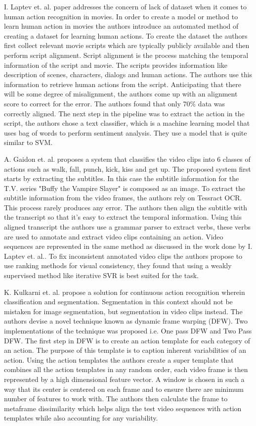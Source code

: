\documentclass[12pt]{report}
\begin{document}
	\cite{i-laptev} I. Laptev et. al. paper addresses the concern of lack of dataset when it comes to human action recognition in movies. In order to create a model or method to learn human action in movies the authors introduce an automated method of creating a dataset for learning human actions. To create the dataset the authors first collect relevant movie scripts which are typically publicly available and then perform script alignment. Script alignment is the process matching the temporal information of the script and movie. The scripts provides information like description of scenes, characters, dialogs and human actions. The authors use this information to retrieve human actions from the script. Anticipating that there will be some degree of misalignment, the authors come up with an alignment score to correct for the error. The authors found that only 70\% data was correctly aligned. The next step in the pipeline was to extract the action in the script, the authors chose a text classifier, which is a machine learning model that uses bag of words to perform sentiment analysis. They use a model that is quite similar to SVM.
	
	\cite{gaidon}A. Gaidon et. al. proposes a system that classifies the video clips into 6 classes of actions such as walk, fall, punch, kick, kiss and get up. The proposed system first starts by extracting the subtitles. In this case the subtitle information for the T.V. series "Buffy the Vampire Slayer" is composed as an image. To extract the subtitle information from the video frames, the authors rely on Tessract OCR. This process rarely produces any error. The authors then align the subtitle with the transcript so that it's easy to extract the temporal information. Using this aligned transcript the authors use a grammar parser to extract verbs, these verbs are used to annotate and extract video clips containing an action. Video sequences are represented in the same method as discussed in the work done by  I. Laptev et. al.. To fix inconsistent annotated video clips the authors propose to use ranking methods for visual consistency, they found that using a weakly supervised method like iterative SVR is best suited for the task.
	
	\cite{kulkarni} K. Kulkarni et. al. propose a solution for continuous action recognition wherein classification and segmentation. Segmentation in this context should not be mistaken for image segmentation, but segmentation in video clips instead. The authors devise a novel technique known as dynamic frame warping (DFW). Two implementations of the technique was proposed i.e. One pass DFW and Two Pass DFW. The first step in DFW is to create an action template for each category of an action. The purpose of this template is to caption inherent variabilities of an action. Using the action templates the authors create a super template that combines all the action templates in any random order, each video frame is then represented by a high dimensional feature vector. A window is chosen in such a way that its center is centered on each frame and to ensure there are minimum number of features to work with. The authors then calculate the frame to metaframe dissimilarity which helps align the test video sequences with action templates while also accounting for any variability.
	
\end{document}
